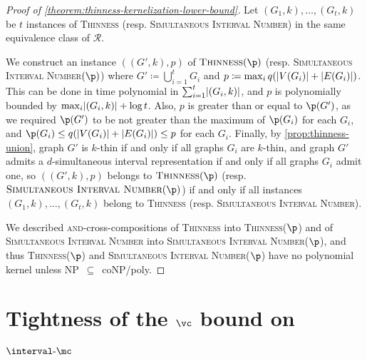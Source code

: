 \documentclass[11pt]{article}
\theoremstyle{plain}
\theoremstyle{definition}
\theoremstyle{remark}
\newcommand{\intervalmc}{\text{$\interval$-$\mc$}}
\newcommand{\NP}{{\smaller[0.83]\textsf{\textup{NP}}}}
\newcommand{\coNP}{{\smaller[0.83]\textsf{\textup{coNP}}}}
\newcommand{\poly}{{\smaller[0.83]\textsf{\textup{poly}}}}
\newcommand{\notHip}{\NP~$\subseteq$~\coNP/\poly}
\DeclarePairedDelimiter\abs{\lvert}{\rvert}
\begin{document}
\begin{appendices}
\begin{proof}[Proof of \cref{theorem:thinness-kernelization-lower-bound}]
    Let $(G_1, k), \dots, (G_t, k)$ be $t$ instances of \textsc{Thinness} {(resp. \textsc{Simultaneous Interval Number})} in the same equivalence class of $\mathcal{R}$. 
    
    We construct an instance $((G', k), p)$ of $\textsc{Thinness}(\p)$ {(resp. \textsc{Simultaneous Interval Number}$(\p)$)} where $G' \coloneqq \bigcup_{i=1}^t G_i$ and $p \coloneqq \max_i q(\abs{V(G_i)} + \abs{E(G_i)})$. This can be done in time polynomial in $\sum_{i=1}^t \abs{(G_i, k)}$, and $p$ is polynomially bounded by $\max_i \abs{(G_i, k)} + \log t$. Also, $p$ is greater than or equal to $\p(G')$, as we required $\p(G')$ to be not greater than the maximum of $\p(G_i)$ for each $G_i$, and $\p(G_i) \leq q(\abs{V(G_i)} + \abs{E(G_i)}) \leq p$ for each $G_i$. Finally, by \cref{prop:thinness-union}, graph $G'$ is $k$-thin if and only if all graphs $G_i$ are $k$-thin, {and graph $G'$ admits a $d$-simultaneous interval representation if and only if all graphs $G_i$ admit one,}
    so $((G', k), p)$ belongs to $\textsc{Thinness}(\p)$ {(resp. $\textsc{Simultaneous Interval Number}(\p)$)} if and only if all instances $(G_1, k), \dots, (G_t, k)$ belong to \textsc{Thinness} {(resp. \textsc{Simultaneous Interval Number})}.

    We described \textsc{and}-cross-compositions of \textsc{Thinness} into \textsc{Thinness($\p$)} {and of \textsc{Simultaneous Interval Number} into \textsc{Simultaneous Interval Number($\p$)}}, and thus \textsc{Thinness($\p$)} {and \textsc{Simultaneous Interval Number($\p$)} have} no polynomial kernel unless \notHip.
\end{proof}


\section{Tightness of the $\vc$ bound on $\intervalmc$}
\label{sec:clustermc-vs-twin-cover}


\end{appendices}
\end{document}
